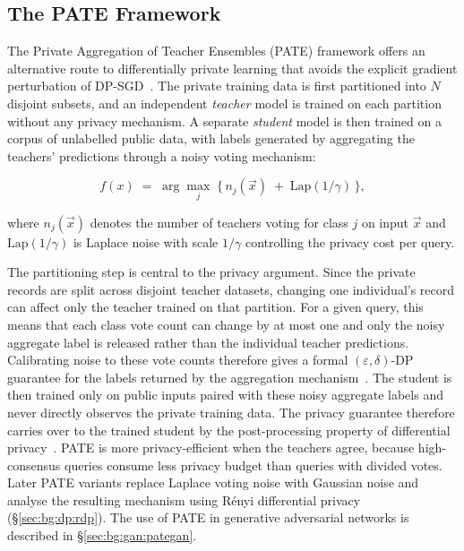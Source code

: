 \subsection{The PATE Framework}
\label{sec:bg:dp:pate}

The Private Aggregation of Teacher Ensembles (PATE) framework
offers an alternative route to
differentially private learning that avoids the explicit gradient perturbation
of DP-SGD~\cite{Papernot2017PATE}. The private training data is first 
partitioned into $N$ disjoint
subsets, and an independent \emph{teacher} model is trained on each partition
without any privacy mechanism. A separate \emph{student} model is then
trained on a corpus of unlabelled public data, with labels generated by
aggregating the teachers' predictions through a noisy voting mechanism:

\begin{equation}
\label{eq:bg:dp:pate}
f(x) \;=\; \arg\max_{j}\;\Big\{\, n_{j}(\vec{x}) \;+\; \mathrm{Lap}(1/\gamma)\,\Big\},
\end{equation}

where $n_j(\vec{x})$ denotes the number of teachers voting for class $j$ on
input $\vec{x}$ and $\mathrm{Lap}(1/\gamma)$ is Laplace noise with scale $1/\gamma$
controlling the privacy cost per query.

The partitioning step is central to the privacy argument. Since the private
records are split across disjoint teacher datasets, changing one individual's
record can affect only the teacher trained on that partition. For a given query,
this means that each class vote count can change by at most one and only the
noisy aggregate label is released rather than the individual teacher
predictions. Calibrating noise to these vote counts therefore gives a formal
$(\varepsilon,\delta)$-DP guarantee for the labels returned by the aggregation
mechanism~\cite{Papernot2017PATE}. The student is then trained only on public
inputs paired with these noisy aggregate labels and never directly observes the
private training data. The privacy guarantee therefore carries over to the
trained student by the post-processing property of differential
privacy~\cite{Dwork2014Foundations}. PATE is more privacy-efficient 
when the teachers agree, because
high-consensus queries consume less privacy budget than queries with
divided votes. Later PATE variants replace Laplace voting noise
with Gaussian noise and analyse the resulting mechanism using Rényi
differential privacy~\cite{papernot2018scalable}
(§\ref{sec:bg:dp:rdp}). The use of PATE in generative adversarial networks is
described in §\ref{sec:bg:gan:pategan}.

